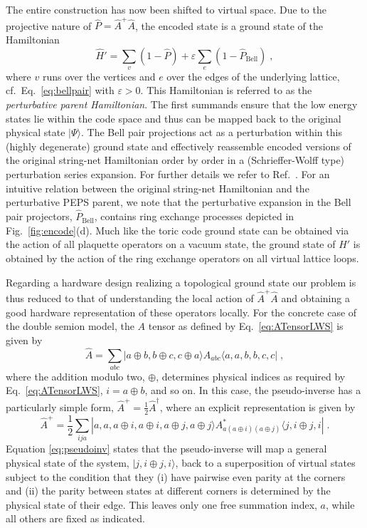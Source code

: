 \documentclass[twocolumn,floats,prx,showpacs]{revtex4-1}
\newcommand{\ket}[1]{|#1\rangle}
\newcommand{\bra}[1]{\langle#1|}
\begin{document}
The entire construction has now been shifted to virtual space. Due to the projective nature of $\hat P=\hat A^+ \hat A$, the encoded state is a ground state of the Hamiltonian
\begin{equation}
\hat H'=\sum_v (1-\hat P) + \varepsilon \sum_e (1-\hat P_\mathrm{Bell}) \label{eq:H} \;,
\end{equation}
where  $v$ runs over the vertices and $e$ over the edges of the underlying lattice, cf.~Eq.~\eqref{eq:bellpair} with $\varepsilon>0$. This Hamiltonian is referred to as the \emph{perturbative parent Hamiltonian}. The first summands ensure that the low energy states lie within the code space and thus can be mapped back to the original physical state $\ket{\Psi}$. The Bell pair projections act as a perturbation within this (highly degenerate) ground state and effectively reassemble encoded versions of the original string-net Hamiltonian order by order in a (Schrieffer-Wolff type) perturbation series expansion. For further details we refer to Ref.~\cite{Brell2014PEPS}. For an intuitive relation between the original string-net Hamiltonian and the perturbative PEPS parent, we note that the perturbative expansion in the Bell pair projectors, $\hat P_\mathrm{Bell}$, contains  ring exchange processes depicted in Fig.~\ref{fig:encode}(d). Much like the toric code ground state can be obtained via the action of all plaquette operators on a vacuum state, the ground state of $\hat H'$ is obtained by the action of the ring exchange operators on all virtual lattice loops.

Regarding a hardware design realizing a topological ground state our problem is thus reduced to that of understanding the local action of $\hat A^+ \hat A$ and obtaining a good hardware representation of these operators locally. For the concrete case of the double semion model, the $A$ tensor as defined by Eq.~\eqref{eq:ATensorLWS} is given by
\begin{equation}
\hat A = \sum_{abc} \ket{a \oplus  b, b \oplus  c, c \oplus  a} A_{abc} \bra{a,a,b,b,c,c}\;,
\end{equation}
where the addition modulo two, $\oplus$, determines physical indices as required by Eq.~\eqref{eq:ATensorLWS}, $i=a\oplus b$, and so on. 
In this case, the pseudo-inverse has a particularly simple form, $\hat A^+=\frac12 \hat A^\dagger$, where an explicit representation is given by
 \begin{equation}\label{eq:pseudoinv}
\hat A^+= \frac{1}{2}\sum_{ija} \ket{a, a, a \oplus i , a \oplus i, a \oplus j, a \oplus j } A^\ast_{a(a\oplus i)(a\oplus j)} \bra{j,i\oplus j,i} \;.
\end{equation}
Equation  \eqref{eq:pseudoinv} 
 states that the pseudo-inverse will map a general physical state of the system, $\ket{j,i\oplus j,i}$, back to a superposition of virtual states subject to the condition that they (i) have pairwise even parity at the corners and (ii) the parity between states at different corners is determined by the physical state of their edge. This leaves  only one free summation index, $a$, while all others are fixed as indicated. 
\end{document}
